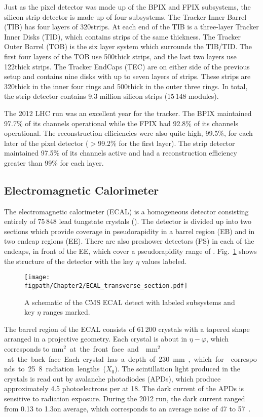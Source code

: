 Just as the pixel detector was made up of the BPIX and FPIX subsystems, the silicon strip detector is made up of four subsystems.
The Tracker Inner Barrel
(TIB) has four layers of 320\mum strips.
At each end of the TIB is a three-layer Tracker Inner Disks (TID), which contains strips of the same thickness.
The Tracker Outer Barrel (TOB) is the six layer system which surrounds the TIB/TID.
The first four layers of the TOB use 500\mum thick strips, and the last two layers use 122\mum thick strips.
The Tracker EndCaps (TEC) are on either side of the previous setup and contains nine disks with up to seven layers of strips.
These strips are 320\mum thick in the inner four rings and 500\mum thick in the outer three rings.
In total, the strip detector contains 9.3 million silicon strips (15\,148 modules).

The 2012 LHC run was an excellent year for the tracker.
The BPIX maintained 97.7\% of its channels operational while the FPIX had 92.8\% of its channels operational.
The reconstruction efficiencies were also quite high, 99.5\%, for each later of the pixel detector ($>$99.2\% for the first layer).
The strip detector maintained 97.5\% of its channels active and had a reconstruction efficiency greater than 99\% for each layer\cite{Veszpremi:2014hpa}. 

\subsection{Electromagnetic Calorimeter}

The electromagnetic calorimeter (ECAL) is a homogeneous detector consisting entirely of 75\,848 lead tungstate crystals (\PbWO).
The detector is divided up into two sections which provide coverage in pseudorapidity  in a barrel region (EB) and  in two endcap regions (EE).
There are also preshower detectors (PS) in each of the endcaps, in front of the EE, which cover a pseudorapidity range of .
Fig.~\ref{fig:CMS_ECAL} shows the structure of the detector with the key $\eta$ values labeled.

\begin{figure}[!hbt]
	\centering
	\texttt{[image: \\figpath/Chapter2/ECAL\_transverse\_section.pdf]}
	\caption{A schematic of the CMS ECAL detect with labeled subsystems and key $\eta$ ranges marked.}
	\label{fig:CMS_ECAL}
\end{figure}

The barrel region of the ECAL consists of 61\,200 crystals with a tapered shape arranged in a projective geometry. Each crystal is about  in $\eta-\varphi$, which corresponds to \unit{mm$^{\text{2}}$} at the front face and \unit{mm$^{\text{2}}$} at the back face. Each crystal has a depth of 230\mm, which for \PbWO corresponds to 25.8 radiation lengths ($X_{0}$). The scintillation light produced in the crystals is read out by avalanche photodiodes (APDs), which produce approximately 4.5 photoelectrons per \MeVns at 18\degC. The dark current of the APDs is sensitive to radiation exposure. During the 2012 run, the dark current ranged from 0.13 to 1.3\muA on average, which corresponds to an average noise of 47 to 57\mev~\cite{CMS:2013ecal}.

